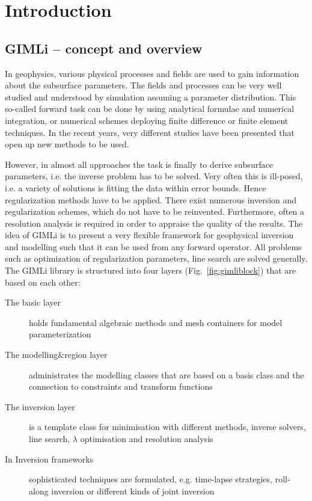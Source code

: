 \section{Introduction}\label{sec:intro}
\subsection{GIMLi -- concept and overview}\label{sec:gimli}
In geophysics, various physical processes and fields are used to gain information about the subsurface parameters.
The fields and processes can be very well studied and understood by simulation assuming a parameter distribution.
This so-called forward task can be done by using analytical formulae and numerical integration, or numerical schemes deploying finite difference or finite element techniques.
In the recent years, very different studies have been presented that open up new methods to be used.

However, in almost all approaches the task is finally to derive subsurface parameters, i.e. the inverse problem has to be solved.
Very often this is ill-posed, i.e. a variety of solutions is fitting the data within error bounds.
Hence regularization methods have to be applied.
There exist numerous inversion and regularization schemes, which do not have to be reinvented.
Furthermore, often a resolution analysis is required in order to appraise the quality of the results.
The idea of GIMLi is to present a very flexible framework for geophysical inversion and modelling such that it can be used from any forward operator.
All problems such as optimization of regularization parameters, line search are solved generally.
The GIMLi library is structured into four layers (Fig.~\ref{fig:gimliblock}) that are based on each other:

\begin{description}
	\item[The basic layer] holds fundamental algebraic methods and mesh containers for model parameterization 
	\item[The modelling\&region layer] administrates the modelling classes that are based on a basis class and the connection to constraints and transform functions
	\item[The inversion layer] is a template class for minimisation with different methods, inverse solvers, line search, $\lambda$ optimisation and resolution analysis
	\item[In Inversion frameworks] sophisticated techniques are formulated, e.g. time-lapse strategies, roll-along inversion or different kinds of joint inversion
\end{description}

